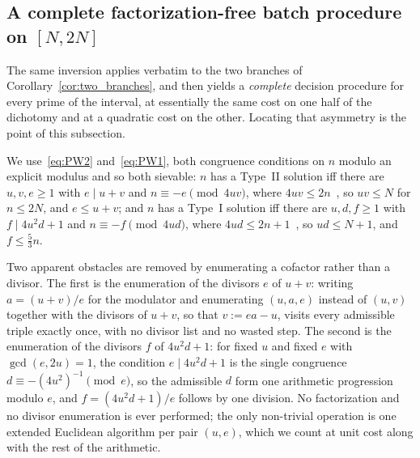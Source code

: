 \documentclass[11pt, a4paper]{article}
\theoremstyle{plain}
\theoremstyle{definition}
\begin{document}
\subsection{A complete factorization-free batch procedure on $[N,2N]$} \label{sec:4.5}

The same inversion applies verbatim to the two branches of Corollary~\ref{cor:two_branches}, and then yields a \emph{complete} decision procedure for every prime of the interval, at essentially the same cost on one half of the dichotomy and at a quadratic cost on the other. Locating that asymmetry is the point of this subsection.

We use~\eqref{eq:PW2} and~\eqref{eq:PW1}, both congruence conditions on $n$ modulo an explicit modulus and so both sievable: $n$ has a Type~II solution iff there are $u,v,e\ge1$ with $e\mid u+v$ and $n\equiv-e \pmod{4uv}$, where $4uv\le 2n$~\cite[(3.4)]{pomerance2026}, so $uv\le N$ for $n\le 2N$, and $e\le u+v$; and $n$ has a Type~I solution iff there are $u,d,f\ge1$ with $f\mid 4u^{2}d+1$ and $n\equiv-f\pmod{4ud}$, where $4ud\le 2n+1$~\cite[Lemma 7.4]{pomerance2026}, so $ud\le N+1$, and $f\le\frac53 n$.

Two apparent obstacles are removed by enumerating a cofactor rather than a divisor. The first is the enumeration of the divisors $e$ of $u+v$: writing $a=(u+v)/e$ for the modulator and enumerating $(u,a,e)$ instead of $(u,v)$ together with the divisors of $u+v$, so that $v:=ea-u$, visits every admissible triple exactly once, with no divisor list and no wasted step. The second is the enumeration of the divisors $f$ of $4u^{2}d+1$: for fixed $u$ and fixed $e$ with $\gcd(e,2u)=1$, the condition $e\mid 4u^{2}d+1$ is the single congruence $d\equiv-(4u^{2})^{-1}\pmod e$, so the admissible $d$ form one arithmetic progression modulo $e$, and $f=(4u^{2}d+1)/e$ follows by one division. No factorization and no divisor enumeration is ever performed; the only non-trivial operation is one extended Euclidean algorithm per pair $(u,e)$, which we count at unit cost along with the rest of the arithmetic.
\end{document}
